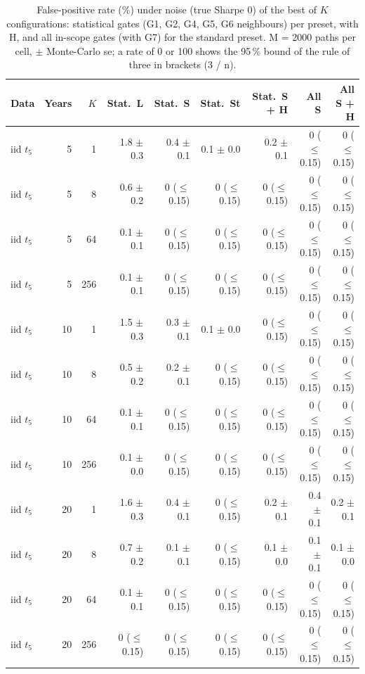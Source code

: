 \begin{table}[H]
\centering
\scriptsize
\caption{False-positive rate (\%) under noise (true Sharpe 0) of the best of $K$ configurations: statistical gates (G1, G2, G4, G5, G6 neighbours) per preset, with H, and all in-scope gates (with G7) for the standard preset. M = 2000 paths per cell, $\pm$ Monte-Carlo se; a rate of 0 or 100 shows the 95\,\% bound of the rule of three in brackets (3 / n).}
\label{tab:O2_fpr}
\setlength{\tabcolsep}{3pt}
\begin{tabular}{lrrrrrrrr}
\toprule
Data & Years & $K$ & Stat.\ L & Stat.\ S & Stat.\ St & Stat.\ S + H & All S & All S + H \\
\midrule
iid $t_5$ & 5 & 1 & 1.8 $\pm$ 0.3 & 0.4 $\pm$ 0.1 & 0.1 $\pm$ 0.0 & 0.2 $\pm$ 0.1 & 0 ($\le$ 0.15) & 0 ($\le$ 0.15) \\
iid $t_5$ & 5 & 8 & 0.6 $\pm$ 0.2 & 0 ($\le$ 0.15) & 0 ($\le$ 0.15) & 0 ($\le$ 0.15) & 0 ($\le$ 0.15) & 0 ($\le$ 0.15) \\
iid $t_5$ & 5 & 64 & 0.1 $\pm$ 0.1 & 0 ($\le$ 0.15) & 0 ($\le$ 0.15) & 0 ($\le$ 0.15) & 0 ($\le$ 0.15) & 0 ($\le$ 0.15) \\
iid $t_5$ & 5 & 256 & 0.1 $\pm$ 0.1 & 0 ($\le$ 0.15) & 0 ($\le$ 0.15) & 0 ($\le$ 0.15) & 0 ($\le$ 0.15) & 0 ($\le$ 0.15) \\
\midrule
iid $t_5$ & 10 & 1 & 1.5 $\pm$ 0.3 & 0.3 $\pm$ 0.1 & 0.1 $\pm$ 0.0 & 0 ($\le$ 0.15) & 0 ($\le$ 0.15) & 0 ($\le$ 0.15) \\
iid $t_5$ & 10 & 8 & 0.5 $\pm$ 0.2 & 0.2 $\pm$ 0.1 & 0 ($\le$ 0.15) & 0 ($\le$ 0.15) & 0 ($\le$ 0.15) & 0 ($\le$ 0.15) \\
iid $t_5$ & 10 & 64 & 0.1 $\pm$ 0.1 & 0 ($\le$ 0.15) & 0 ($\le$ 0.15) & 0 ($\le$ 0.15) & 0 ($\le$ 0.15) & 0 ($\le$ 0.15) \\
iid $t_5$ & 10 & 256 & 0.1 $\pm$ 0.0 & 0 ($\le$ 0.15) & 0 ($\le$ 0.15) & 0 ($\le$ 0.15) & 0 ($\le$ 0.15) & 0 ($\le$ 0.15) \\
\midrule
iid $t_5$ & 20 & 1 & 1.6 $\pm$ 0.3 & 0.4 $\pm$ 0.1 & 0 ($\le$ 0.15) & 0.2 $\pm$ 0.1 & 0.4 $\pm$ 0.1 & 0.2 $\pm$ 0.1 \\
iid $t_5$ & 20 & 8 & 0.7 $\pm$ 0.2 & 0.1 $\pm$ 0.1 & 0 ($\le$ 0.15) & 0.1 $\pm$ 0.0 & 0.1 $\pm$ 0.1 & 0.1 $\pm$ 0.0 \\
iid $t_5$ & 20 & 64 & 0.1 $\pm$ 0.1 & 0 ($\le$ 0.15) & 0 ($\le$ 0.15) & 0 ($\le$ 0.15) & 0 ($\le$ 0.15) & 0 ($\le$ 0.15) \\
iid $t_5$ & 20 & 256 & 0 ($\le$ 0.15) & 0 ($\le$ 0.15) & 0 ($\le$ 0.15) & 0 ($\le$ 0.15) & 0 ($\le$ 0.15) & 0 ($\le$ 0.15) \\

\end{tabular}
\end{table}
